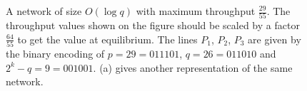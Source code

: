 \documentclass{article}
\begin{document}
\begin{figure}[h]
    \caption{A network of size $O(\log q)$ with maximum throughput $\frac{29}{55}$. The throughput values shown on the figure should be scaled by a factor $\frac{64}{55}$ to get the value at equilibrium. The lines $P_1$, $P_2$, $P_3$ are given by the binary encoding of $p = 29 = 011101$, $q = 26 = 011010$ and $2^k - q = 9 = 001001$.  (a) gives another representation of the same network.}
    \label{fig:network-diagram}
\end{figure}
\end{document}
